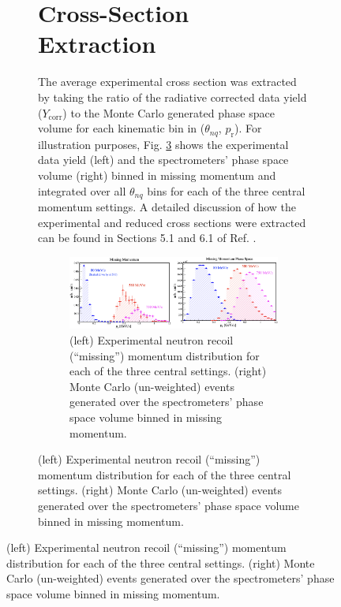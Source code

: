 \documentclass[aps, prl]{revtex4-2}  %
\begin{document}
\begin{figure}[!h]
\begin{figure}[!h]
\section{\large Cross-Section Extraction}
\indent The average experimental cross section was extracted by taking the ratio of the radiative corrected data yield ($Y_{\mathrm{corr}}$) to the Monte Carlo generated phase space volume for each
kinematic bin in ($\theta_{nq}$, $p_{\mathrm{r}}$). For illustration purposes, Fig. \ref{fig:Pm_Ps} shows the experimental data yield (left) and the spectrometers' phase space volume (right) binned in
missing momentum and integrated over all $\theta_{nq}$ bins for each of the three central momentum settings. A detailed discussion of how the experimental and reduced cross sections were extracted can be
found in Sections 5.1 and 6.1 of Ref. \cite{cyero_phdthesis}.
\begin{figure}[!h]
\includegraphics[scale=0.3]{plots/Pr_and_Ps.png}
\caption{(left) Experimental neutron recoil (``missing'') momentum distribution for each of the three central settings. (right) Monte Carlo (un-weighted) events generated over
  the spectrometers' phase space volume binned in missing momentum.}
\label{fig:Pm_Ps}
\end{figure}

\end{figure}
\end{figure}
\end{document}
